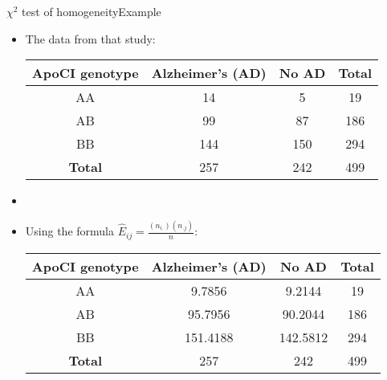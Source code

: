 \documentclass[xcolor=dvipsnames]{beamer}
\begin{document}
\begin{frame}{$\chi^2$ test of homogeneity}{Example}
\begin{itemize}
	\item The data from that study:
	\begin{center}
		\begin{tabular}{c|cc|c}
			\hline
			\textbf{ApoCI genotype} & \textbf{Alzheimer's (AD)} & \textbf{No AD} & \textbf{Total} \\ \hline
			AA & 14 & 5 &  19\\
			AB & 99 & 87 &  186\\
			BB & 144 & 150 &  294\\ \hline
			\textbf{Total} & 257 & 242 & 499
		\end{tabular}
	\end{center}  \pause
	\item[]
	\item Using the formula $\hat{E}_{ij} = \frac{(n_{i.})(n_{.j})}{n}$:  \pause
	\begin{center}
	\begin{tabular}{c|cc|c}
		\hline
		\textbf{ApoCI genotype} & \textbf{Alzheimer's (AD)} & \textbf{No AD} & \textbf{Total}\\ \hline
		AA &   9.7856 &   9.2144 & 19\\
		AB &  95.7956&   90.2044 & 186\\
		BB & 151.4188 & 142.5812 & 294\\ \hline
		\textbf{Total} & 257 & 242 & 499
	\end{tabular}
\end{center}
\end{itemize}
\end{frame}
\end{document}
